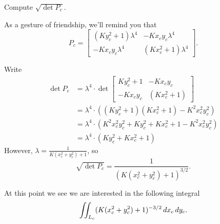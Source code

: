 \documentclass[newpage,hints,12pt,noauthor,handout,nooutcomes]{ximera}
\begin{document}
\begin{problem}
  Compute $\sqrt{\det P_c}$.
  \begin{hint}
    As a gesture of friendship, we'll remind you that
    \[
 P_c =
     \begin{bmatrix}
       \left(Ky_c^2+1\right)\lambda^4 & -Kx_{c}y_{c}\lambda^4\\
       -Kx_{c}y_{c}\lambda^4 & \left(Kx_c^2+1\right)\lambda^4
     \end{bmatrix}.
    \]
  \end{hint}
  \begin{freeResponse}
    Write
    \begin{align*}
    \det P_c &= \lambda^4\cdot \det \begin{bmatrix}
       Ky_c^2+1 & -Kx_{c}y_{c}\\
       -Kx_{c}y_{c} & \left(Kx_c^2+1\right)
    \end{bmatrix}\\
    &= \lambda^4\cdot\left(\left( Ky_c^2+1\right)\left(Kx_c^2+1\right) - K^2x_{c}^2y_{c}^2\right)\\
    &= \lambda^4\cdot\left(K^2x_{c}^2y_{c}^2 + Ky_c^2+Kx_c^2+1-K^2x_{c}^2y_{c}^2\right)\\
    &= \lambda^4\cdot\left(Ky_c^2+Kx_c^2+1\right)
    \end{align*}
    However, $\lambda = \frac{1}{K\left(x_c^2+y_c^2\right)+1}$, so
    \[
    \sqrt{\det P_c} = \frac{1}{\left(K\left(x_c^2+y_c^2\right)+1\right)^{3/2}}.
    \]
  \end{freeResponse}
\end{problem}

At this point we see we are interested in the following integral
\[
\iint_{L_c} (K(x_c^2+y_c^2)+1)^{-3/2} \,d x_c\,d y_c.
\]
\end{document}
